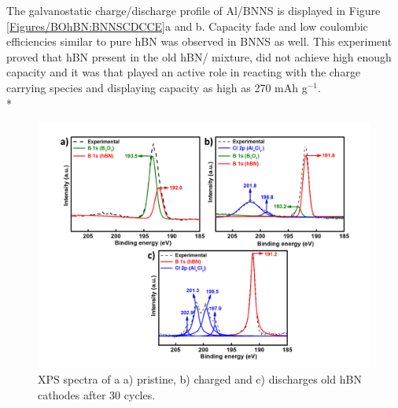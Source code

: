 The galvanostatic charge/discharge profile of Al/BNNS is displayed in Figure \ref{Figures/BOhBN:BNNSCDCCE}a and b. Capacity fade and low coulombic efficiencies similar to pure hBN was observed in BNNS as well. This experiment proved that hBN present in the old hBN/ mixture, did not achieve high enough capacity and it was  that played an active role in reacting with the charge carrying species and displaying capacity as high as 270 mAh g$^{-1}$. \\*

\begin{figure}[tbh!]
\centering
\includegraphics[width=\textwidth]{Figures/BOhBN/oldhBNXPS}
\caption{XPS spectra of a a) pristine, b) charged and c) discharges old hBN cathodes after 30 cycles.}
\label{Figures/BOhBN:oldhBNXPS}
\end{figure}

